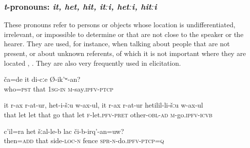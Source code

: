 
\subsubsection{\textit{t}-pronouns: \textit{it, het, hit, itːi, hetːi, hitːi}}
\label{sssec:t-pronouns}

These pronouns refer to persons or objects whose location is undifferentiated, irrelevant, or impossible to determine or that are not close to the speaker or the hearer. They are used, for instance, when talking about people that are not present, or about unknown referents, of which it is not important where they are located , . They are also very frequently used in elicitation.
%
\begin{exe}
	\ex	\label{Who was that (masc.) who told me that}
	\gll	ča=de	it	di-cːe	Ø-ik'ʷ-an?\\
		who=\textsc{pst}	that	\textsc{1sg-in}	\textsc{m}-say.\textsc{ipfv-ptcp}\\
	\glt	{}

		\label{He left her and went to that, he left her and when to the next.}
	\sn
	\gll	it	r-ax	r-at-ur,	het-i-šːu	w-ax-ul,	it	r-ax	r-at-ur	hetilil-li-šːu	w-ax-ul\\
		that	\tsc{f-}let	let	that	go	that	let	\textsc{f}-let.\textsc{pfv}-\textsc{pret}	other-\textsc{obl-ad}	\textsc{m}-go.\textsc{ipfv}-\textsc{icvb}\\
	\glt	{}

		\label{talking about a stone fence that the speaker is building; both speaker} 
	\sn
	\gll	c'il=ra	het	šːal-le-b	lac	či-b-irq'-an=uw?\\	
		then=\textsc{add}	that	side-\textsc{loc}-\textsc{n}	fence	\textsc{spr}-\textsc{n}-do.\textsc{ipfv}-\textsc{ptcp}=\textsc{q} \\
	\glt	{}
\end{exe}

